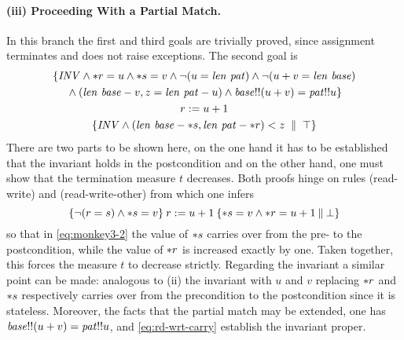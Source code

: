 \paragraph{(iii) Proceeding With a Partial Match.}
In this branch the first and third goals are trivially proved, since assignment
terminates and does not raise exceptions. The second goal is
\begin{gather}
\nonumber
\{\mathit{INV} \land {\ast r} = u\land {\ast s} = v\land \lnot(u=\mathit{len}~\mathit{pat})\land
  \lnot(u+v = \mathit{len}~\mathit{base}) \\\nonumber
  {}\land (\mathit{len}~\mathit{base} - v,  z = \mathit{len}~\mathit{pat} - u)
  \land \mathit{base}!!(u+v) = \mathit{pat}!!u\}\\
\label{eq:monkey3-2}
  {r := u + 1}\\\nonumber
  \{\mathit{INV} \land (\mathit{len}~\mathit{base} - {\ast s}, \mathit{len}~\mathit{pat} - {\ast r})
  < z \;\parallel\; \top\}
\end{gather}
There are two parts to be shown here, on the one hand it has to be established
that the invariant holds in the postcondition and on the other hand, one must
show that the termination measure $t$ decreases. Both proofs hinge on rules
(read-write) and (read-write-other) from which one infers 
\begin{equation}
\label{eq:rd-wrt-carry}
\{\lnot(r = s) \land
  {\ast s} = v\}\:r := u+1\:\{{\ast s} = v \land {\ast r} = u+1\:\|\:\bot\}
\end{equation}
so that in \eqref{eq:monkey3-2} the value of ${\ast s}$ carries over from the pre-
to the postcondition, while the value of ${\ast r}$ is increased exactly by one.
Taken together, this forces the measure $t$ to decrease strictly. Regarding the
invariant a similar point can be made: analogous to (ii) the invariant with $u$
and $v$ replacing ${\ast r}$ and ${\ast s}$ respectively carries over from the
precondition to the postcondition since it is stateless. Moreover, the facts
that the partial match may be extended, \IE one has $\mathit{base}!!(u+v) =
\mathit{pat}!!u$, and \eqref{eq:rd-wrt-carry} establish the invariant proper.


